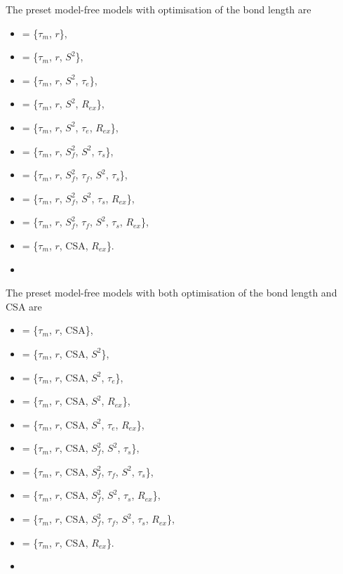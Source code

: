  The preset model-free models with optimisation of the bond length are 
  

 \begin{itemize} 
 \item[]  = \{$\tau_m$, $r$\},  
 \item[]  = \{$\tau_m$, $r$, $S^2$\},  
 \item[]  = \{$\tau_m$, $r$, $S^2$, $\tau_e$\},  
 \item[]  = \{$\tau_m$, $r$, $S^2$, $R_{ex}$\},  
 \item[]  = \{$\tau_m$, $r$, $S^2$, $\tau_e$, $R_{ex}$\},  
 \item[]  = \{$\tau_m$, $r$, $S^2_f$, $S^2$, $\tau_s$\},  
 \item[]  = \{$\tau_m$, $r$, $S^2_f$, $\tau_f$, $S^2$, $\tau_s$\},  
 \item[]  = \{$\tau_m$, $r$, $S^2_f$, $S^2$, $\tau_s$, $R_{ex}$\},  
 \item[]  = \{$\tau_m$, $r$, $S^2_f$, $\tau_f$, $S^2$, $\tau_s$, $R_{ex}$\},  
 \item[]  = \{$\tau_m$, $r$, CSA, $R_{ex}$\}.  
 \item[]  
 \end{itemize} 
  

 The preset model-free models with both optimisation of the bond length and CSA are 
  

 \begin{itemize} 
 \item[]  = \{$\tau_m$, $r$, CSA\},  
 \item[]  = \{$\tau_m$, $r$, CSA, $S^2$\},  
 \item[]  = \{$\tau_m$, $r$, CSA, $S^2$, $\tau_e$\},  
 \item[]  = \{$\tau_m$, $r$, CSA, $S^2$, $R_{ex}$\},  
 \item[]  = \{$\tau_m$, $r$, CSA, $S^2$, $\tau_e$, $R_{ex}$\},  
 \item[]  = \{$\tau_m$, $r$, CSA, $S^2_f$, $S^2$, $\tau_s$\},  
 \item[]  = \{$\tau_m$, $r$, CSA, $S^2_f$, $\tau_f$, $S^2$, $\tau_s$\},  
 \item[]  = \{$\tau_m$, $r$, CSA, $S^2_f$, $S^2$, $\tau_s$, $R_{ex}$\},  
 \item[]  = \{$\tau_m$, $r$, CSA, $S^2_f$, $\tau_f$, $S^2$, $\tau_s$, $R_{ex}$\},  
 \item[]  = \{$\tau_m$, $r$, CSA, $R_{ex}$\}.  
 \item[]  
 \end{itemize} 
  

